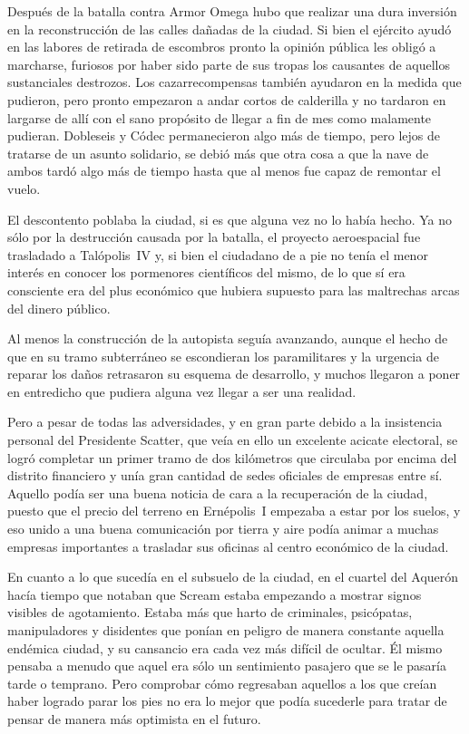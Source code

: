 \parbreak
Después de la batalla contra Armor Omega hubo que realizar una dura inversión en la reconstrucción de las calles dañadas de la ciudad. Si bien el ejército ayudó en las labores de retirada de escombros pronto la opinión pública les obligó a marcharse, furiosos por haber sido parte de sus tropas los causantes de aquellos sustanciales destrozos. Los cazarrecompensas también ayudaron en la medida que pudieron, pero pronto empezaron a andar cortos de calderilla y no tardaron en largarse de allí con el sano propósito de llegar a fin de mes como malamente pudieran. Dobleseis y Códec permanecieron algo más de tiempo, pero lejos de tratarse de un asunto solidario, se debió más que otra cosa a que la nave de ambos tardó algo más de tiempo hasta que al menos fue capaz de remontar el vuelo.

El descontento poblaba la ciudad, si es que alguna vez no lo había hecho. Ya no sólo por la destrucción causada por la batalla, el proyecto aeroespacial fue trasladado a Talópolis~IV y, si bien el ciudadano de a pie no tenía el menor interés en conocer los pormenores científicos del mismo, de lo que sí era consciente era del plus económico que hubiera supuesto para las maltrechas arcas del dinero público.

Al menos la construcción de la autopista seguía avanzando, aunque el hecho de que en su tramo subterráneo se escondieran los paramilitares y la urgencia de reparar los daños retrasaron su esquema de desarrollo, y muchos llegaron a poner en entredicho que pudiera alguna vez llegar a ser una realidad.

Pero a pesar de todas las adversidades, y en gran parte debido a la insistencia personal del Presidente Scatter, que veía en ello un excelente acicate electoral, se logró completar un primer tramo de dos kilómetros que circulaba por encima del distrito financiero y unía gran cantidad de sedes oficiales de empresas entre sí. Aquello podía ser una buena noticia de cara a la recuperación de la ciudad, puesto que el precio del terreno en Ernépolis~I empezaba a estar por los suelos, y eso unido a una buena comunicación por tierra y aire podía animar a muchas empresas importantes a trasladar sus oficinas al centro económico de la ciudad.

En cuanto a lo que sucedía en el subsuelo de la ciudad, en el cuartel del Aquerón hacía tiempo que notaban que Scream estaba empezando a mostrar signos visibles de agotamiento. Estaba más que harto de criminales, psicópatas, manipuladores y disidentes que ponían en peligro de manera constante aquella endémica ciudad, y su cansancio era cada vez más difícil de ocultar. Él mismo pensaba a menudo que aquel era sólo un sentimiento pasajero que se le pasaría tarde o temprano. Pero comprobar cómo regresaban aquellos a los que creían haber logrado parar los pies no era lo mejor que podía sucederle para tratar de pensar de manera más optimista en el futuro.

